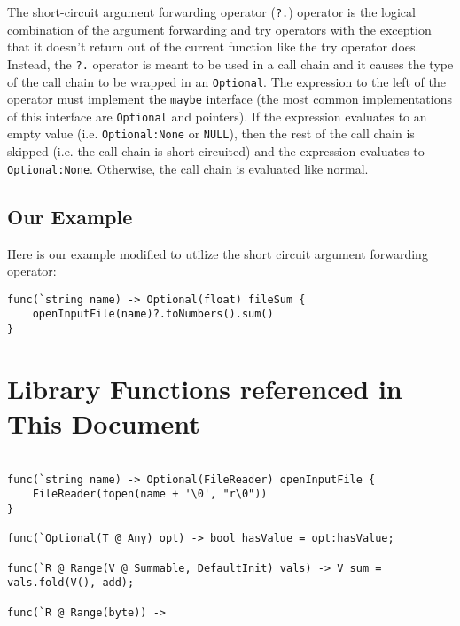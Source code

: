 \documentclass{article}
\begin{document}
	The short-circuit argument forwarding operator (\verb|?.|) operator is the logical combination
	of the argument forwarding and try operators with the exception that it doesn't return out of
	the current function like the try operator does.
	Instead, the \verb|?.| operator is meant to be used in a call chain and it causes the type of
	the call chain to be wrapped in an \verb|Optional|.
	The expression to the left of the operator must implement the \verb|maybe| interface (the most
	common implementations of this interface are \verb|Optional| and pointers).
	If the expression evaluates to an empty value (i.e. \verb|Optional:None| or \verb|NULL|), then
	the rest of the call chain is skipped (i.e. the call chain is short-circuited) and the
	expression evaluates to \verb|Optional:None|.
	Otherwise, the call chain is evaluated like normal.

	\subsection{Our Example}

	Here is our example modified to utilize the short circuit argument forwarding operator:

	\begin{lstlisting}
func(`string name) -> Optional(float) fileSum {
	openInputFile(name)?.toNumbers().sum()
}
	\end{lstlisting}

	\section{Library Functions referenced in This Document}

	\begin{lstlisting}

func(`string name) -> Optional(FileReader) openInputFile {
	FileReader(fopen(name + '\0', "r\0"))
}

func(`Optional(T @ Any) opt) -> bool hasValue = opt:hasValue;

func(`R @ Range(V @ Summable, DefaultInit) vals) -> V sum = vals.fold(V(), add);

func(`R @ Range(byte)) -> 

	\end{lstlisting}
\end{document}
